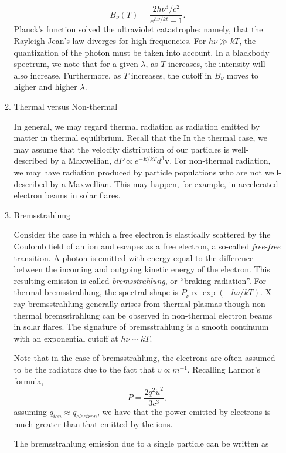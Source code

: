 \begin{enumerate}
\begin{enumerate}
				\begin{equation}
					B_{\nu}(T) = \frac{2h\nu^3/c^2}{e^{h\nu/kt} - 1}.
				\end{equation}
				Planck's function solved the ultraviolet catastrophe: namely, that the Rayleigh-Jean's law diverges for high frequencies. For $h\nu\gg kT$, the quantization of the photon must be taken into account. In a blackbody spectrum, we note that for a given $\lambda$, as $T$ increases, the intensity will also increase. Furthermore, as $T$ increases, the cutoff in $B_{\nu}$ moves to higher and higher $\lambda$.
				\item{Thermal versus Non-thermal}
				\par In general, we may regard thermal radiation as radiation emitted by matter in thermal equilibrium. Recall that the In the thermal case, we may assume that the velocity distribution of our particles is well-described by a Maxwellian, $dP\propto e^{-E/kT}d^3\mathbf{v}$. For non-thermal radiation, we may have radiation produced by particle populations who are not well-described by a Maxwellian. This may happen, for example, in accelerated electron beams in solar flares. 
				\item{Bremsstrahlung}
				\par Consider the case in which a free electron is elastically scattered by the Coulomb field of an ion and escapes as a free electron, a so-called \textit{free-free} transition. A photon is emitted with energy equal to the difference between the incoming and outgoing kinetic energy of the electron. This resulting emission is called \textit{bremsstrahlung}, or ``braking radiation''. For thermal bremsstrahlung, the spectral shape is $P_{\nu}\propto\exp{(-h\nu/kT)}$. X-ray bremsstrahlung generally arises from thermal plasmas though non-thermal bremsstrahlung can be observed in non-thermal electron beams in solar flares. The signature of bremsstrahlung is a smooth continuum with an exponential cutoff at $h\nu\sim kT$.
				\par Note that in the case of bremsstrahlung, the electrons are often assumed to be the radiators due to the fact that $\dot{v}\propto m^{-1}$. Recalling Larmor's formula,
				\begin{equation}
					P=\frac{2q^2\dot{u}^2}{3c^3},
				\end{equation}
				assuming $q_{ion}\approx q_{electron}$, we have that the power emitted by electrons is much greater than that emitted by the ions. 
				\par The bremsstrahlung emission due to a single particle can be written as 

\end{enumerate}
\end{enumerate}
